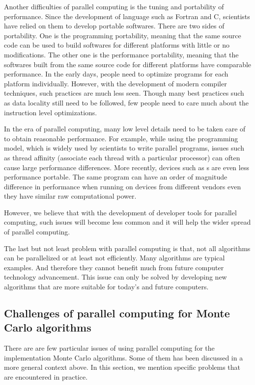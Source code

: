 Another difficulties of parallel computing is the tuning and portability of
performance. Since the development of language such as Fortran and C,
scientists have relied on them to develop portable softwares. There are two
sides of portability. One is the programming portability, meaning that the
same source code can be used to build softwares for different platforms with
little or no modifications. The other one is the performance portability,
meaning that the softwares built from the same source code for different
platforms have comparable performance. In the early days, people need to
optimize programs for each platform individually. However, with the
development of modern compiler techniques, such practices are much less seen.
Though many best practices such as data locality still need to be followed,
few people need to care much about the instruction level optimizations.

In the era of parallel computing, many low level details need to be taken care
of to obtain reasonable performance. For example, while using the \openmp
programming model, which is widely used by scientists to write parallel
programs, issues such as thread affinity (associate each thread with a
particular processor) can often cause large performance differences. More
recently, devices such as \gpu{}s are even less performance portable. The same
\opencl program can have an order of magnitude difference in performance when
running on devices from different vendors even they have similar raw
computational power.

However, we believe that with the development of developer tools for parallel
computing, such issues will become less common and it will help the wider
spread of parallel computing.

The last but not least problem with parallel computing is that, not all
algorithms can be parallelized or at least not efficiently. Many \mcmc
algorithms are typical examples. And therefore they cannot benefit much from
future computer technology advancement. This issue can only be solved by
developing new algorithms that are more suitable for today's and future
computers.

\subsection{Challenges of parallel computing for Monte Carlo algorithms}
\label{sub:Challenges of parallel computing for Monte Carlo algorithms}

There are are few particular issues of using parallel computing for the
implementation Monte Carlo algorithms. Some of them has been discussed in a
more general context above. In this section, we mention specific problems that
are encountered in practice.

